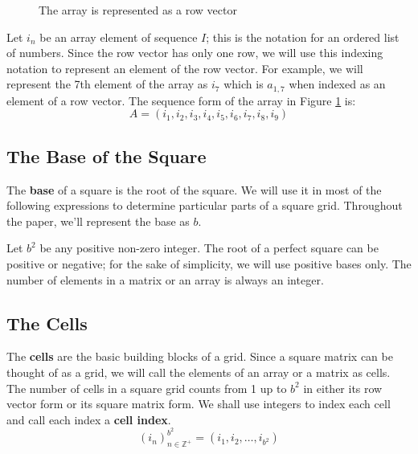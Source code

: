 \documentclass[letterpaper, twoside,12pt]{article}
\begin{document}
    \begin{figure}[ht]
        \centering
        \caption{The array is represented as a row vector} \label{row_vector_form}
    \end{figure}

    Let $i_n$ be an array element of sequence $I$; this is the notation for an ordered list of numbers. Since the row vector has only one row, we will use this indexing notation to represent an element of the row vector. For example, we will represent the 7th element of the array as $i_7$ which is $a_{1,7}$ when indexed as an element of a row vector. The sequence form of the array in Figure \ref{row_vector_form} is:
    \begin{equation}
        A = (i_1,i_2,i_3,i_4,i_5,i_6,i_7,i_8,i_9)
    \end{equation}

    \subsection{The Base of the Square} \label{base}
    The \textbf{base} of a square is the root of the square. We will use it in most of the following expressions to determine particular parts of a square grid. Throughout the paper, we'll represent the base as $b$. 

    Let $b^2$ be any positive non-zero integer. The root of a perfect square can be positive or negative; for the sake of simplicity, we will use positive bases only. The number of elements in a matrix or an array is always an integer.

    \subsection{The Cells} \label{cells}
    The \textbf{cells} are the basic building blocks of a grid. Since a square matrix can be thought of as a grid, we will call the elements of an array or a matrix as cells. The number of cells in a square grid counts from 1 up to $b^2$ in either its row vector form or its square matrix form. We shall use integers to index each cell and call each index a \textbf{cell index}.
    \begin{equation}
        (i_n)^{b^2}_{n\in\mathbb{Z}^+} = (i_1, i_2, \dots ,i_{b^2})
    \end{equation}
\end{document}
